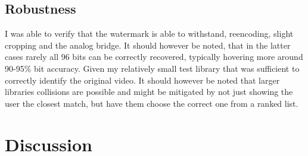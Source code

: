 \documentclass[12pt, technote]{IEEEtran}
\begin{document}
\subsection{Robustness}
I was able to verify that the watermark is able to withstand, reencoding, slight cropping and the analog bridge. It should however be noted, that in the latter cases rarely all 96 bits can be correctly recovered, typically hovering more around 90-95\% bit accuracy. Given my relatively small test library that was sufficient to correctly identify the original video. It should however be noted that larger libraries collisions are possible and might be mitigated by not just showing the user the closest match, but have them choose the correct one from a ranked list.

\section{Discussion}
\end{document}
